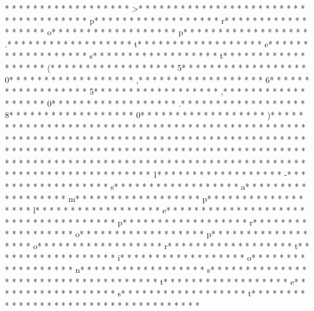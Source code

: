 * * *  * * *  * * *  *  * * *  *  * * *  * >* * *  * * *  * * *  *  * * *  *  * * *  *  * * *  * * *  * * *  *  * * *  *  * * *  * p* * *  * * *  * * *  *  * * *  *  * * *  * r* * *  * * *  * * *  *  * * *  *  * * *  * o* * *  * * *  * * *  *  * * *  *  * * *  * p* * *  * * *  * * *  *  * * *  *  * * *  * .* * *  * * *  * * *  *  * * *  *  * * *  * t* * *  * * *  * * *  *  * * *  *  * * *  * e* * *  * * *  * * *  *  * * *  *  * * *  * s* * *  * * *  * * *  *  * * *  *  * * *  * t* * *  * * *  * * *  *  * * *  *  * * *  * (* * *  * * *  * * *  *  * * *  *  * * *  * 5* * *  * * *  * * *  *  * * *  *  * * *  * 0* * *  * * *  * * *  *  * * *  *  * * *  * ,* * *  * * *  * * *  *  * * *  *  * * *  * 6* * *  * * *  * * *  *  * * *  *  * * *  * 5* * *  * * *  * * *  *  * * *  *  * * *  * ,* * *  * * *  * * *  *  * * *  *  * * *  * 0* * *  * * *  * * *  *  * * *  *  * * *  * .* * *  * * *  * * *  *  * * *  *  * * *  * 8* * *  * * *  * * *  *  * * *  *  * * *  * 0* * *  * * *  * * *  *  * * *  *  * * *  * )* * *  * * *  * * *  *  * * *  *  * * *  * 
* * *  * * *  * * *  *  * * *  *  * * *  * 
* * *  * * *  * * *  *  * * *  *  * * *  *  * * *  * * *  * * *  *  * * *  *  * * *  *  * * *  * * *  * * *  *  * * *  *  * * *  *  * * *  * * *  * * *  *  * * *  *  * * *  *  * * *  * * *  * * *  *  * * *  *  * * *  *  * * *  * * *  * * *  *  * * *  *  * * *  *  * * *  * * *  * * *  *  * * *  *  * * *  *  * * *  * * *  * * *  *  * * *  *  * * *  *  * * *  * * *  * * *  *  * * *  *  * * *  * 1* * *  * * *  * * *  *  * * *  *  * * *  * -* * *  * * *  * * *  *  * * *  *  * * *  * s* * *  * * *  * * *  *  * * *  *  * * *  * a* * *  * * *  * * *  *  * * *  *  * * *  * m* * *  * * *  * * *  *  * * *  *  * * *  * p* * *  * * *  * * *  *  * * *  *  * * *  * l* * *  * * *  * * *  *  * * *  *  * * *  * e* * *  * * *  * * *  *  * * *  *  * * *  *  * * *  * * *  * * *  *  * * *  *  * * *  * p* * *  * * *  * * *  *  * * *  *  * * *  * r* * *  * * *  * * *  *  * * *  *  * * *  * o* * *  * * *  * * *  *  * * *  *  * * *  * p* * *  * * *  * * *  *  * * *  *  * * *  * o* * *  * * *  * * *  *  * * *  *  * * *  * r* * *  * * *  * * *  *  * * *  *  * * *  * t* * *  * * *  * * *  *  * * *  *  * * *  * i* * *  * * *  * * *  *  * * *  *  * * *  * o* * *  * * *  * * *  *  * * *  *  * * *  * n* * *  * * *  * * *  *  * * *  *  * * *  * s* * *  * * *  * * *  *  * * *  *  * * *  *  * * *  * * *  * * *  *  * * *  *  * * *  * t* * *  * * *  * * *  *  * * *  *  * * *  * e* * *  * * *  * * *  *  * * *  *  * * *  * s* * *  * * *  * * *  *  * * *  *  * * *  * t* * *  * * *  * * *  *  * * *  *  * * *  * 
* * *  * * *  * * *  *  * * *  *  * * *  * 
